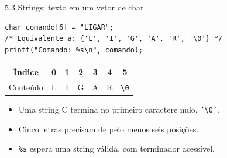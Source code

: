 \begin{frame}[fragile]{5.3 Strings: texto em um vetor de char}
\begin{lstlisting}
char comando[6] = "LIGAR";
/* Equivalente a: {'L', 'I', 'G', 'A', 'R', '\0'} */
printf("Comando: %s\n", comando);
\end{lstlisting}
\begin{center}
\begin{tabular}{c|cccccc}
Índice & 0 & 1 & 2 & 3 & 4 & 5 \\
\hline
Conteúdo & L & I & G & A & R & \texttt{\textbackslash 0} \\
\end{tabular}
\end{center}
\begin{itemize}
\item Uma string C termina no primeiro caractere nulo, \texttt{'\textbackslash 0'}.
\item Cinco letras precisam de pelo menos seis posições.
\item \texttt{\%s} espera uma string válida, com terminador acessível.
\end{itemize}
\end{frame}
